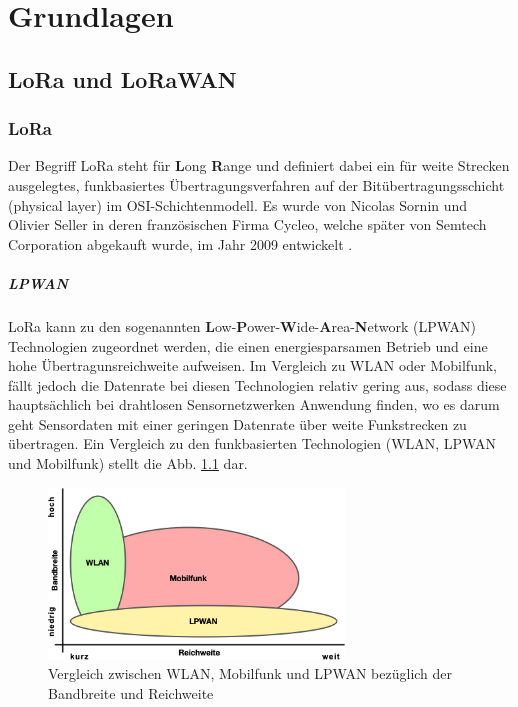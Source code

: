 
\chapter{Grundlagen} \label{Grundlagen}
\section{LoRa und LoRaWAN} \label{LoRa und LoRaWAN}
\subsection{LoRa} \label{LoRa}

Der Begriff LoRa steht für \textbf{L}ong \textbf{R}ange und definiert dabei ein für weite Strecken ausgelegtes, funkbasiertes Übertragungsverfahren auf der Bitübertragungsschicht (physical layer) im OSI-Schichtenmodell. Es wurde von Nicolas Sornin und Olivier Seller in deren französischen Firma Cycleo, welche später von Semtech Corporation abgekauft wurde, im Jahr 2009 entwickelt \cite{semtech2020}. 

\paragraph{LPWAN}

LoRa kann zu den sogenannten \textbf{L}ow-\textbf{P}ower-\textbf{W}ide-\textbf{A}rea-\textbf{N}etwork (LPWAN) Technologien zugeordnet werden, die einen energiesparsamen Betrieb und eine hohe Übertragunsreichweite aufweisen. Im Vergleich zu WLAN oder Mobilfunk, fällt jedoch die Datenrate bei diesen Technologien relativ gering aus, sodass diese hauptsächlich bei drahtlosen Sensornetzwerken Anwendung finden, wo es darum geht Sensordaten mit einer geringen Datenrate über weite Funkstrecken zu übertragen. Ein Vergleich zu den funkbasierten Technologien (WLAN, LPWAN und Mobilfunk) stellt die Abb. \ref{fig:lpwan} dar.

\begin{figure}[h]
 \centering
 \includegraphics[width=0.7\textwidth]{pictures/lpwan-wlan-mobilfunk}
 \caption[Vergleich zwischen WLAN, Mobilfunk und LPWAN bezüglich der Bandbreite und Reichweite]{Vergleich zwischen WLAN, Mobilfunk und LPWAN bezüglich der Bandbreite und Reichweite \cite{lpwan2022}}
 \label{fig:lpwan}
\end{figure}

